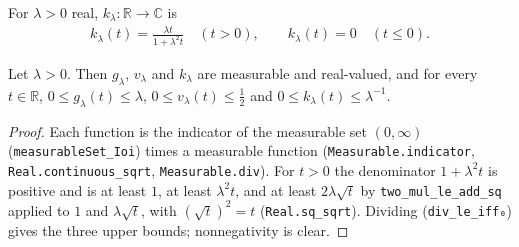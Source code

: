 \begin{definition}
    \label{def:van-daele-k}
    \leanok
    For $\lambda > 0$ real, $k_\lambda : \mathbb{R} \to \mathbb{C}$ is
    \begin{align}
        k_\lambda(t) = \frac{\lambda t}{1 + \lambda^2 t} \quad (t > 0), \qquad k_\lambda(t) = 0 \quad (t \le 0).
    \end{align}
\end{definition}

\begin{lemma}
    \label{lmm:van-daele-functions-bounded}
    \leanok
    Let $\lambda > 0$. Then $g_\lambda$, $v_\lambda$ and $k_\lambda$ are measurable and real-valued, and for every $t \in \mathbb{R}$, $0 \le g_\lambda(t) \le \lambda$, $0 \le v_\lambda(t) \le \tfrac{1}{2}$ and $0 \le k_\lambda(t) \le \lambda^{-1}$.
\end{lemma}
\begin{proof}
    \leanok
    Each function is the indicator of the measurable set $(0, \infty)$ (\texttt{measurableSet\_Ioi}) times a measurable function (\texttt{Measurable.indicator}, \texttt{Real.continuous\_sqrt}, \texttt{Measurable.div}). For $t > 0$ the denominator $1 + \lambda^2t$ is positive and is at least $1$, at least $\lambda^2 t$, and at least $2\lambda\sqrt{t}$ by \texttt{two\_mul\_le\_add\_sq} applied to $1$ and $\lambda\sqrt{t}$, with $(\sqrt{t})^2 = t$ (\texttt{Real.sq\_sqrt}). Dividing (\texttt{div\_le\_iff₀}) gives the three upper bounds; nonnegativity is clear.
\end{proof}

